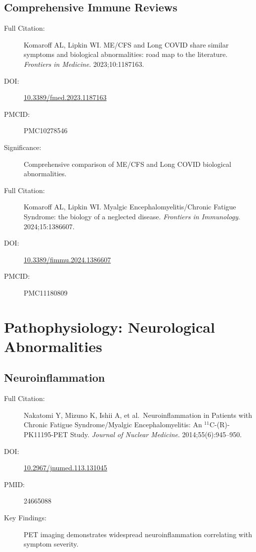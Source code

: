 \subsection{Comprehensive Immune Reviews}

\begin{description}
    \item[Full Citation:] Komaroff AL, Lipkin WI. ME/CFS and Long COVID share similar symptoms and biological abnormalities: road map to the literature. \textit{Frontiers in Medicine}. 2023;10:1187163.
    \item[DOI:] \href{https://doi.org/10.3389/fmed.2023.1187163}{10.3389/fmed.2023.1187163}
    \item[PMCID:] PMC10278546
    \item[Significance:] Comprehensive comparison of ME/CFS and Long COVID biological abnormalities.
\end{description}

\begin{description}
    \item[Full Citation:] Komaroff AL, Lipkin WI. Myalgic Encephalomyelitis/Chronic Fatigue Syndrome: the biology of a neglected disease. \textit{Frontiers in Immunology}. 2024;15:1386607.
    \item[DOI:] \href{https://doi.org/10.3389/fimmu.2024.1386607}{10.3389/fimmu.2024.1386607}
    \item[PMCID:] PMC11180809
\end{description}

\section{Pathophysiology: Neurological Abnormalities}
\label{sec:bib-neurological}

\subsection{Neuroinflammation}

\begin{description}
    \item[Full Citation:] Nakatomi Y, Mizuno K, Ishii A, et al.\ Neuroinflammation in Patients with Chronic Fatigue Syndrome/Myalgic Encephalomyelitis: An $^{11}$C-(R)-PK11195-PET Study. \textit{Journal of Nuclear Medicine}. 2014;55(6):945--950.
    \item[DOI:] \href{https://doi.org/10.2967/jnumed.113.131045}{10.2967/jnumed.113.131045}
    \item[PMID:] 24665088
    \item[Key Findings:] PET imaging demonstrates widespread neuroinflammation correlating with symptom severity.
\end{description}

